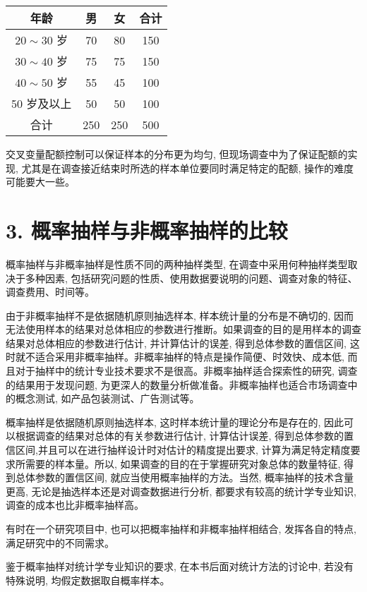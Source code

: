 \documentclass[10pt]{article}
\begin{document}
\begin{CJK*}{UTF8}{bsmi}
\begin{center}
\begin{tabular}{cccc}
\hline
年龄 & 男 & 女 & 合计 \\
\hline
$20 \sim 30$ 岁 & 70 & 80 & 150 \\
$30 \sim 40$ 岁 & 75 & 75 & 150 \\
$40 \sim 50$ 岁 & 55 & 45 & 100 \\
50 岁及以上 & 50 & 50 & 100 \\
\hline
合计 & 250 & 250 & 500 \\
\hline
\end{tabular}
\end{center}

交叉变量配额控制可以保证样本的分布更为均匀, 但现场调查中为了保证配额的实现, 尤其是在调查接近结束时所选的样本单位要同时满足特定的配额, 操作的难度可能要大一些。

\section*{3. 概率抽样与非概率抽样的比较}
概率抽样与非概率抽样是性质不同的两种抽样类型, 在调查中采用何种抽样类型取决于多种因素, 包括研究问题的性质、使用数据要说明的问题、调查对象的特征、调查费用、时间等。

由于非概率抽样不是依据随机原则抽选样本, 样本统计量的分布是不确切的, 因而无法使用样本的结果对总体相应的参数进行推断。如果调查的目的是用样本的调查结果对总体相应的参数进行估计, 并计算估计的误差, 得到总体参数的置信区间, 这时就不适合采用非概率抽样。非概率抽样的特点是操作简便、时效快、成本低, 而且对于抽样中的统计专业技术要求不是很高。非概率抽样适合探索性的研究, 调查的结果用于发现问题, 为更深人的数量分析做准备。非概率抽样也适合市场调查中的概念测试, 如产品包装测试、广告测试等。

概率抽样是依据随机原则抽选样本, 这时样本统计量的理论分布是存在的, 因此可以根据调查的结果对总体的有关参数进行估计, 计算估计误差, 得到总体参数的置信区间,并且可以在进行抽样设计时对估计的精度提出要求, 计算为满足特定精度要求所需要的样本量。所以, 如果调查的目的在于掌握研究对象总体的数量特征, 得到总体参数的置信区间, 就应当使用概率抽样的方法。当然, 概率抽样的技术含量更高, 无论是抽选样本还是对调查数据进行分析, 都要求有较高的统计学专业知识, 调查的成本也比非概率抽样高。

有时在一个研究项目中, 也可以把概率抽样和非概率抽样相结合, 发挥各自的特点,满足研究中的不同需求。

鉴于概率抽样对统计学专业知识的要求, 在本书后面对统计方法的讨论中, 若没有特殊说明, 均假定数据取自概率样本。


\end{CJK*}
\end{document}
